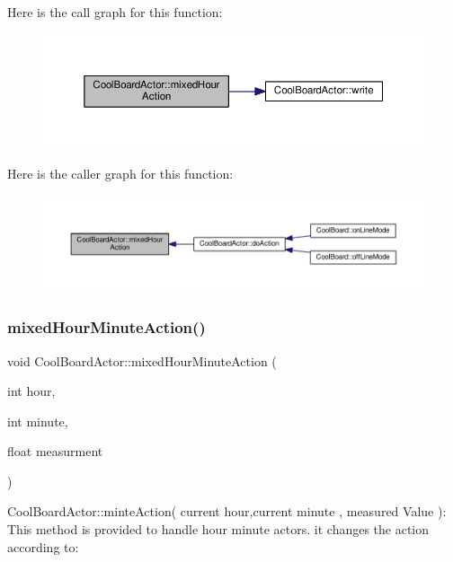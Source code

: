 Here is the call graph for this function\+:\nopagebreak
\begin{figure}[H]
\begin{center}
\leavevmode
\includegraphics[width=350pt]{dc/d69/class_cool_board_actor_a6d93a24502c56ced2ef7675c913a276b_cgraph}
\end{center}
\end{figure}
Here is the caller graph for this function\+:\nopagebreak
\begin{figure}[H]
\begin{center}
\leavevmode
\includegraphics[width=350pt]{dc/d69/class_cool_board_actor_a6d93a24502c56ced2ef7675c913a276b_icgraph}
\end{center}
\end{figure}
\mbox{\label{class_cool_board_actor_ae6b2a17b0e73cfeb353ded2cc4e08109}} 
\subsubsection{\texorpdfstring{mixed\+Hour\+Minute\+Action()}{mixedHourMinuteAction()}}
{\footnotesize\ttfamily void Cool\+Board\+Actor\+::mixed\+Hour\+Minute\+Action (\begin{DoxyParamCaption}\item[{int}]{hour,  }\item[{int}]{minute,  }\item[{float}]{measurment }\end{DoxyParamCaption})}

Cool\+Board\+Actor\+::minte\+Action( current hour,current minute , measured Value )\+: This method is provided to handle hour minute actors. it changes the action according to\+:

